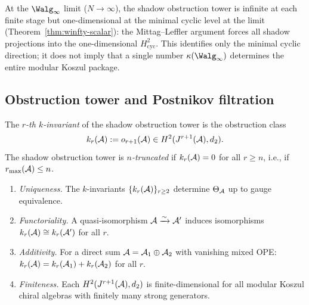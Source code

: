 \begin{remark}
\label{rem:winfty-limit-reconstruction}
At the $\Walg_\infty$ limit ($N \to \infty$), the
shadow obstruction tower is infinite at each finite stage but
one-dimensional at the minimal cyclic level at the limit
(Theorem~\ref{thm:winfty-scalar}): the
Mittag--Leffler argument forces all shadow projections
into the one-dimensional $H^2_{\mathrm{cyc}}$.
This identifies only the minimal cyclic direction; it does not imply
that a single number $\kappa(\Walg_\infty)$ determines the entire
modular Koszul package.
\end{remark}


\subsection{Obstruction tower and Postnikov filtration}
\label{subsec:obstruction-tower}

\begin{definition}
\label{def:shadow-k-invariant}
The \emph{$r$-th $k$-invariant} of the shadow obstruction tower is
the obstruction class
\begin{equation}\label{eq:shadow-k-invariant}
k_r(\mathcal{A}) := o_{r+1}(\mathcal{A}) \in H^2(J^{r+1}(\mathcal{A}), d_2).
\end{equation}
The shadow obstruction tower is
\emph{$n$-truncated} if $k_r(\mathcal{A}) = 0$ for all
$r \geq n$, i.e., if $r_{\max}(\mathcal{A}) \leq n$.
\end{definition}

\begin{proposition}
\label{prop:postnikov-filtration-structure}
\begin{enumerate}[label=\textup{(\roman*)}]
\item \emph{Uniqueness.}
The $k$-invariants $\{k_r(\mathcal{A})\}_{r \geq 2}$ determine
$\Theta_{\mathcal{A}}$ up to gauge equivalence.

\item \emph{Functoriality.}
A quasi-isomorphism $\mathcal{A} \xrightarrow{\sim} \mathcal{A}'$ induces
isomorphisms $k_r(\mathcal{A}) \cong k_r(\mathcal{A}')$ for all $r$.

\item \emph{Additivity.}
For a direct sum $\mathcal{A} = \mathcal{A}_1 \oplus \mathcal{A}_2$ with
vanishing mixed OPE:
$k_r(\mathcal{A}) = k_r(\mathcal{A}_1) + k_r(\mathcal{A}_2)$ for all $r$.

\item \emph{Finiteness.}
Each $H^2(J^{r+1}(\mathcal{A}), d_2)$ is finite-dimensional
for all modular Koszul chiral algebras with
finitely many strong generators.
\end{enumerate}
\end{proposition}

